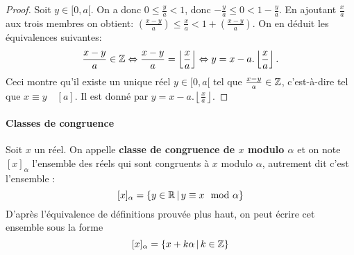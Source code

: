 \begin{proof}
Soit $y \in [0,a[$. On a donc $0\leq \frac{y}{a} < 1$, donc $-\frac{y}{a}\leq 0 < 1 -\frac{y}{a}$. En ajoutant $\frac{x}{a}$ aux trois membres on obtient: $\left(\frac{x-y}{a}\right)\leq \frac{x}{a} < 1 +\left(\frac{x-y}{a}\right)$.
On en déduit les équivalences suivantes:
\[ \frac{x-y}{a} \in \mathbb{Z} \Leftrightarrow \frac{x-y}{a} = \left\lfloor \frac{x}{a}\right\rfloor \Leftrightarrow y=x-a.\left\lfloor\frac{x}{a}\right\rfloor.\]
Ceci montre qu'il existe un unique réel $y \in [0,a[$ tel que $ \frac{x-y}{a} \in \mathbb{Z}$, c'est-à-dire tel que $x \equiv y\quad [a]$. Il est donné par $y=x-a.\left\lfloor\frac{x}{a}\right\rfloor$.
\end{proof}

\paragraph{Classes de congruence}

\begin{definition}
Soit $x$ un réel. On appelle \textbf{classe de congruence de $x$ modulo $\alpha$} et on note $[x]_\alpha$  l'ensemble des réels qui sont congruents à $x$ modulo $\alpha$, autrement dit c'est l'ensemble : 
\[ [x]_\alpha=\ensemble{y\in\R}{y\equiv x \mod \alpha}\]
D'après l'équivalence de définitions prouvée plus haut, on peut écrire cet ensemble sous la forme
\[ [x]_\alpha=\ensemble {x+k\alpha}{k\in\Z}\]
\end{definition}
